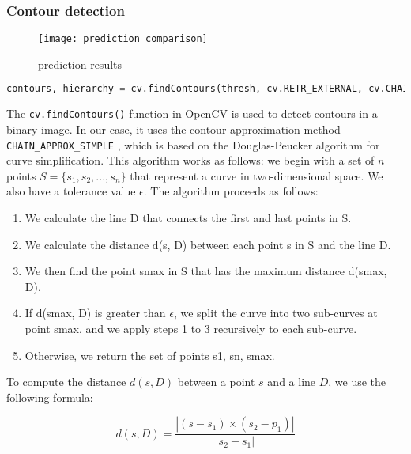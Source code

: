 \subsubsection{Contour detection}
\FloatBarrier
\begin{figure}[h]

         \centering
        \texttt{[image: prediction\_comparison]}
   
        \caption{prediction results}
        \label{fig:prediction results}
\FloatBarrier
    \end{figure}
\FloatBarrier
\FloatBarrier
\begin{lstlisting}[language=Python]
    contours, hierarchy = cv.findContours(thresh, cv.RETR_EXTERNAL, cv.CHAIN_APPROX_SIMPLE)

\end{lstlisting}
\FloatBarrier



The \texttt{cv.findContours()} function in OpenCV is used to detect contours in a binary image. In our case, it uses the contour approximation method \texttt{CHAIN\_APPROX\_SIMPLE} \cite{CD21}, which is based on the Douglas-Peucker algorithm for curve simplification. This algorithm works as follows:
we begin with a set of $n$ points $S = \{s_1, s_2, ..., s_n\}$ that represent a curve in two-dimensional space. We also have a tolerance value $\epsilon$. The algorithm proceeds as follows:

\begin{enumerate}
\item  We calculate the line D that connects the first and last points in S.
\item  We calculate the distance d(s, D) between each point s in S and the line D.
\item We then find the point smax in S that has the maximum distance d(smax, D).
\item If d(smax, D) is greater than $\epsilon$, we split the curve into two sub-curves at point smax, and we apply steps 1 to 3 recursively to each sub-curve.
\item Otherwise, we return the set of points {s1, sn, smax}.
\end{enumerate}

To compute the distance $d(s, D)$ between a point $s$ and a line $D$, we use the following formula:

\begin{equation*}
    d(s, D) = \frac{|(s - s_1) \times (s_2 - p_1)|}{|s_2 - s_1|}
\end{equation*}

